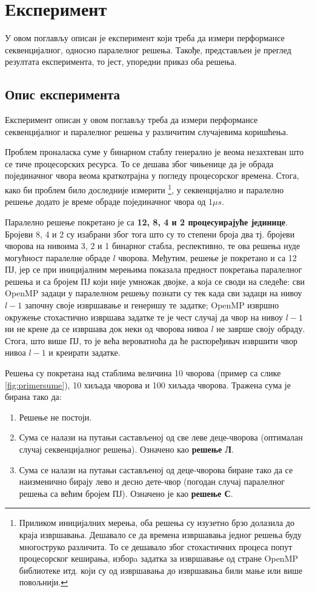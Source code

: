 \section{Експеримент}

У овом поглављу описан је експеримент који треба да измери перформансе секвенцијалног, односно паралелног решења.
Такође, представљен је преглед резултата експеримента, то јест, упоредни приказ оба решења.

\subsection{Опис експеримента}

Експеримент описан у овом поглављу треба да измери перформансе секвенцијалног и паралелног решења у различитим случајевима коришћења.

Проблем проналаска суме у бинарном стаблу генерално је веома незахтеван што се тиче процесорских ресурса.
То се дешава због чињенице да је обрада појединачног чвора веома краткотрајна у погледу процесорског времена.
Стога, како би проблем било доследније измерити
\footnote{Приликом иницијалних мерења, оба решења су изузетно брзо долазила до краја извршавања.
Дешавало се да времена извршавања једног решења буду многоструко различита.
То се дешавало због стохастичних процеса попут процесорског кеширања, изборa задатка за извршавање од стране OpenMP библиотеке итд.
који су од извршавања до извршавања били мање или више повољнији.},
у секвенцијално и паралелно решење додато је време обраде појединачног чвора од $1\mu s$.

Паралелно решење покретано је са \textbf{12, 8, 4 и 2 процесуирајуће јединице}.
Бројеви 8, 4 и 2 су изабрани због тога што су то степени броја два тј. бројеви чворова на нивоима 3, 2 и 1 бинарног стабла, респективно, те ова решења нуде
могућност паралелне обраде $l$ чворова. Међутим, решење је покретано и са 12 ПЈ, јер се при иницијалним мерењима показала предност покретања паралелног решења
и са бројем ПЈ који није умножак двојке, а која се своди на следеће: сви OpenMP задаци у паралелном решењу познати су тек када сви задаци на нивоу $l-1$ започну
своје извршавање и генеришу те задатке; OpenMP извршно окружење стохастично извршава задатке те је чест случај да чвор на нивоу $l-1$ ни не крене да се извршава
док неки од чворова нивоа $l$ не заврше своју обраду. Стога, што више ПЈ, то је већа вероватноћа да ће распоређивач извршити чвор нивоа $l-1$ и креирати задатке.

Решења су покретана над стаблима величина 10 чворова (пример са слике \ref{fig:primersume}), 10 хиљада чворова и 100 хиљада чворова.
Тражена сума је бирана тако да:
\begin{enumerate}
    \item Решење не постоји.
    \item Сума се налази на путањи састављеној од све леве деце-чворова (оптималан случај секвенцијалног решења). Означено као \textbf{решење Л}.
    \item Сума се налази на путањи састављеној од деце-чворова биране тако да се наизменично бирају лево и десно дете-чвор (погодан случај паралелног решења са већим бројем ПЈ).
    Означено је као \textbf{решење С}.
\end{enumerate}

